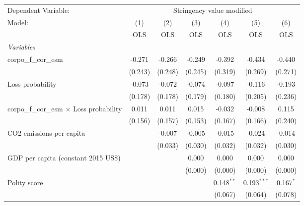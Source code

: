 
\begingroup
\centering
\begin{tabular}{lcccccc}
   \toprule
   Dependent Variable: & \multicolumn{6}{c}{Stringency value modified}\\
   Model:                                           & (1)     & (2)     & (3)     & (4)          & (5)           & (6)\\  
                                                    &  OLS    & OLS     & OLS     & OLS          & OLS           & OLS\\  
   \midrule
   \emph{Variables}\\
   corpo\_f\_cor\_esm                               & -0.271  & -0.266  & -0.249  & -0.392       & -0.434        & -0.440\\   
                                                    & (0.243) & (0.248) & (0.245) & (0.319)      & (0.269)       & (0.271)\\   
   Loss probability                                 & -0.073  & -0.072  & -0.074  & -0.097       & -0.116        & -0.193\\   
                                                    & (0.178) & (0.178) & (0.179) & (0.180)      & (0.205)       & (0.236)\\   
   corpo\_f\_cor\_esm $\times$ Loss probability     & 0.011   & 0.011   & 0.015   & -0.032       & -0.008        & 0.115\\   
                                                    & (0.156) & (0.157) & (0.153) & (0.167)      & (0.166)       & (0.240)\\   
   CO2 emissions per capita                         &         & -0.007  & -0.005  & -0.015       & -0.024        & -0.014\\   
                                                    &         & (0.033) & (0.030) & (0.032)      & (0.032)       & (0.030)\\   
   GDP per capita (constant 2015 US\$)              &         &         & 0.000   & 0.000        & 0.000         & 0.000\\   
                                                    &         &         & (0.000) & (0.000)      & (0.000)       & (0.000)\\   
   Polity score                                     &         &         &         & 0.148$^{**}$ & 0.193$^{***}$ & 0.167$^{*}$\\   
                                                    &         &         &         & (0.067)      & (0.064)       & (0.078)\\   

\end{tabular}
